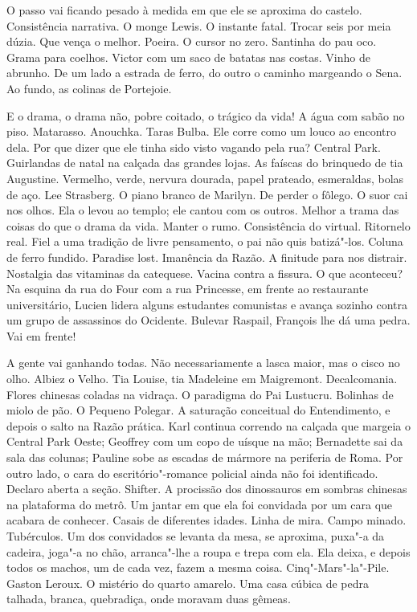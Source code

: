 O passo vai ficando pesado à medida em que ele se aproxima do castelo.
Consistência narrativa. O monge Lewis. O instante fatal. Trocar seis por
meia dúzia. Que vença o melhor. Poeira. O cursor no zero. Santinha do
pau oco. Grama para coelhos. Victor com um saco de batatas nas costas.
Vinho de abrunho. De um lado a estrada de ferro, do outro o caminho
margeando o Sena. Ao fundo, as colinas de Portejoie.

E o drama, o drama não, pobre coitado, o trágico da vida! A água com
sabão no piso. Matarasso. Anouchka. Taras Bulba. Ele corre como um louco
ao encontro dela. Por que dizer que ele tinha sido visto vagando pela
rua? Central Park. Guirlandas de natal na calçada das grandes lojas. As
faíscas do brinquedo de tia Augustine. Vermelho, verde, nervura dourada,
papel prateado, esmeraldas, bolas de aço. Lee Strasberg. O piano branco
de Marilyn. De perder o fôlego. O suor cai nos olhos. Ela o levou ao
templo; ele cantou com os outros. Melhor a trama das coisas do que o
drama da vida. Manter o rumo. Consistência do virtual. Ritornelo real.
Fiel a uma tradição de livre pensamento, o pai não quis batizá"-los.
Coluna de ferro fundido. Paradise lost. Imanência da Razão. A finitude
para nos distrair. Nostalgia das vitaminas da catequese. Vacina contra a
fissura. O que aconteceu? Na esquina da rua do Four com a rua Princesse,
em frente ao restaurante universitário, Lucien lidera alguns estudantes
comunistas e avança sozinho contra um grupo de assassinos do Ocidente.
Bulevar Raspail, François lhe dá uma pedra. Vai em frente!

A gente vai ganhando todas. Não necessariamente a lasca maior, mas o
cisco no olho. Albiez o Velho. Tia Louise, tia Madeleine em Maigremont.
Decalcomania. Flores chinesas coladas na vidraça. O paradigma do Pai
Lustucru. Bolinhas de miolo de pão. O Pequeno Polegar. A saturação
conceitual do Entendimento, e depois o salto na Razão prática. Karl
continua correndo na calçada que margeia o Central Park Oeste; Geoffrey
com um copo de uísque na mão; Bernadette sai da sala das colunas;
Pauline sobe as escadas de mármore na periferia de Roma. Por outro lado,
o cara do escritório"-romance policial ainda não foi identificado.
Declaro aberta a seção. Shifter. A procissão dos dinossauros em sombras
chinesas na plataforma do metrô. Um jantar em que ela foi convidada por
um cara que acabara de conhecer. Casais de diferentes idades. Linha de
mira. Campo minado. Tubérculos. Um dos convidados se levanta da mesa, se
aproxima, puxa"-a da cadeira, joga"-a no chão, arranca"-lhe a roupa e trepa
com ela. Ela deixa, e depois todos os machos, um de cada vez, fazem a
mesma coisa. Cinq"-Mars"-la"-Pile. Gaston Leroux. O mistério do quarto
amarelo. Uma casa cúbica de pedra talhada, branca, quebradiça, onde
moravam duas gêmeas.


